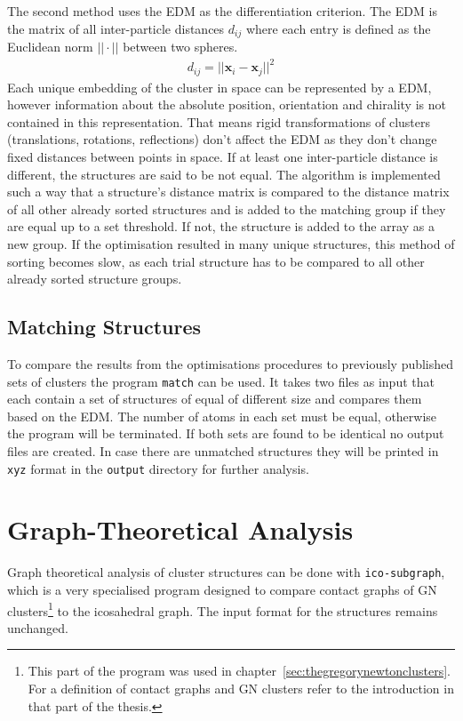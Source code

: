 The second method uses the \ac{EDM} as the differentiation criterion. The
\ac{EDM} is the matrix of all inter-particle distances $d_{ij}$ where
each entry is defined as the Euclidean norm $||\cdot||$ between two spheres.
%
\begin{align}
    d_{ij}=||\mathbf{x}_i-\mathbf{x}_j||^2
\end{align}
%
Each unique embedding of the cluster in space can be represented by a \ac{EDM},
however information about the absolute position, orientation and chirality is
not contained in this representation. That means rigid transformations of
clusters (translations, rotations, reflections) don't affect the \ac{EDM} as
they don't change fixed distances between points in
space.\autocite{Dokmanic_EuclideanDistanceMatrices_2015} If at least one
inter-particle distance is different, the structures are said to be not equal.
The algorithm is implemented such a way that a structure's distance matrix is
compared to the distance matrix of all other already sorted structures and is
added to the matching group if they are equal up to a set threshold. If not, the
structure is added to the array as a new group. If the optimisation resulted in
many unique structures, this method of sorting becomes slow, as each trial
structure has to be compared to all other already sorted structure groups.

\subsection{Matching Structures}
\label{sec:matchingstructures}

To compare the results from the optimisations procedures to previously
published sets of clusters the program \verb|match| can be used. It takes two
files as input that each contain a set of structures of equal of different size
and compares them based on the \ac{EDM}. The number of atoms in each set must
be equal, otherwise the program will be terminated. If both sets are found to
be identical no output files are created. In case there are unmatched
structures they will be printed in \verb|xyz| format in the \verb|output|
directory for further analysis.

\section{Graph-Theoretical Analysis}
\label{sec:GraphTheoreticalAnalysis}

Graph theoretical analysis of cluster structures can be done with
\verb|ico-subgraph|, which is a very specialised program designed to compare
contact graphs of \ac{GN} clusters\footnote{This part of the program was used in
chapter~\ref{sec:thegregorynewtonclusters}. For a definition of contact graphs
and \ac{GN} clusters refer to the introduction in that part of the thesis.} to
the icosahedral graph. The input format for the structures remains unchanged.


